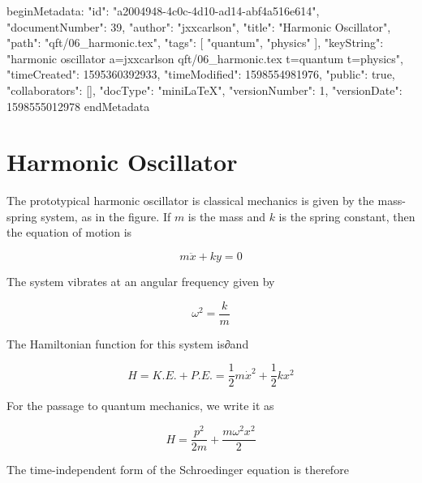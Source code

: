 beginMetadata:
{
    "id": "a2004948-4c0c-4d10-ad14-abf4a516e614",
    "documentNumber": 39,
    "author": "jxxcarlson",
    "title": "Harmonic Oscillator",
    "path": "qft/06_harmonic.tex",
    "tags": [
        "quantum",
        "physics"
    ],
    "keyString": "harmonic oscillator a=jxxcarlson qft/06_harmonic.tex t=quantum t=physics",
    "timeCreated": 1595360392933,
    "timeModified": 1598554981976,
    "public": true,
    "collaborators": [],
    "docType": "miniLaTeX",
    "versionNumber": 1,
    "versionDate": 1598555012978
}
endMetadata
\begin{mathmacro}
\newcommand{\bra}[0]{\langle}
\newcommand{\ket}[0](\rangle}
\newcommand{\set}[1]{\{#1\}}
\end{mathmacro}

\setcounter{section}{6}

\section{Harmonic Oscillator}

\innertableofcontents

The prototypical harmonic oscillator is classical mechanics is given by the mass-spring system, as in the figure.  If $m$ is the mass and $k$ is the spring constant, then the equation of motion is

\begin{equation}
m\ddot x + ky = 0
\end{equation}

The system vibrates at an angular frequency given by

\begin{equation}
\omega^2 = \frac{k}{m}
\end{equation}

The Hamiltonian function for this system is∂and 

\begin{equation}
  H = K.E. + P.E. = \frac{1}{2}m\dot x^2 + \frac{1}{2}kx^2 
\end{equation}

For the passage to quantum mechanics, we write it as

\begin{equation}
  H =  \frac{p^2}{2m} + \frac{m\omega^2 x^2  }{2}
\end{equation}

The time-independent form of the Schroedinger equation is therefore

